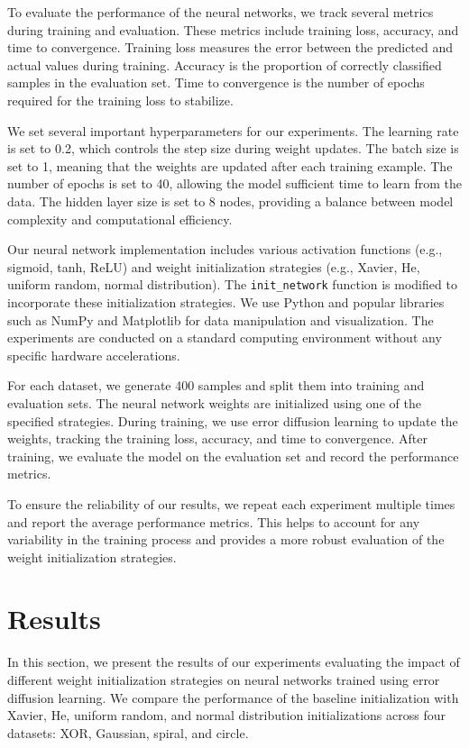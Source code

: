 \documentclass{article} %
\begin{document}
To evaluate the performance of the neural networks, we track several metrics during training and evaluation. These metrics include training loss, accuracy, and time to convergence. Training loss measures the error between the predicted and actual values during training. Accuracy is the proportion of correctly classified samples in the evaluation set. Time to convergence is the number of epochs required for the training loss to stabilize.

We set several important hyperparameters for our experiments. The learning rate is set to 0.2, which controls the step size during weight updates. The batch size is set to 1, meaning that the weights are updated after each training example. The number of epochs is set to 40, allowing the model sufficient time to learn from the data. The hidden layer size is set to 8 nodes, providing a balance between model complexity and computational efficiency.

Our neural network implementation includes various activation functions (e.g., sigmoid, tanh, ReLU) and weight initialization strategies (e.g., Xavier, He, uniform random, normal distribution). The \texttt{init\_network} function is modified to incorporate these initialization strategies. We use Python and popular libraries such as NumPy and Matplotlib for data manipulation and visualization. The experiments are conducted on a standard computing environment without any specific hardware accelerations.

For each dataset, we generate 400 samples and split them into training and evaluation sets. The neural network weights are initialized using one of the specified strategies. During training, we use error diffusion learning to update the weights, tracking the training loss, accuracy, and time to convergence. After training, we evaluate the model on the evaluation set and record the performance metrics.

To ensure the reliability of our results, we repeat each experiment multiple times and report the average performance metrics. This helps to account for any variability in the training process and provides a more robust evaluation of the weight initialization strategies.

\section{Results}
\label{sec:results}

In this section, we present the results of our experiments evaluating the impact of different weight initialization strategies on neural networks trained using error diffusion learning. We compare the performance of the baseline initialization with Xavier, He, uniform random, and normal distribution initializations across four datasets: XOR, Gaussian, spiral, and circle.
\end{document}
